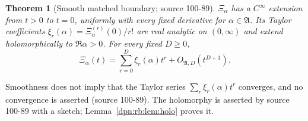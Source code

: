 \documentclass[11pt]{article}
\numberwithin{equation}{section}
\newtheorem{theorem}{Theorem}[section]
\theoremstyle{definition}\newtheorem{definition}[theorem]{Definition}
\theoremstyle{remark}\newtheorem{remark}[theorem]{Remark}
\newcommand{\src}[1]{\textup{(source #1)}}
\begin{document}
\begin{theorem}[Smooth matched boundary; source 100-89]\label{dpn:rb:thm:smooth}
$\Xi_\alpha$ has a $C^\infty$ extension from $t>0$ to $t=0$, uniformly with
every fixed derivative for $\alpha\in\mathfrak A$.  Its Taylor coefficients
$\xi_r(\alpha)=\Xi_\alpha^{(r)}(0)/r!$ are real analytic on $(0,\infty)$ and
extend holomorphically to $\Re\alpha>0$.  For every fixed $D\ge0$,
\begin{equation}\label{dpn:rb:eq:Xiexp}
 \Xi_\alpha(t)=\sum_{r=0}^D\xi_r(\alpha)t^r+O_{\mathfrak A,D}(t^{D+1}).
\end{equation}
\end{theorem}
Smoothness does not imply that the Taylor series $\sum_r\xi_r(\alpha)t^r$
converges, and no convergence is asserted \src{100-89}.  The holomorphy is
asserted by source 100-89 with a sketch; Lemma~\ref{dpn:rb:lem:holo} proves it.
\end{document}
